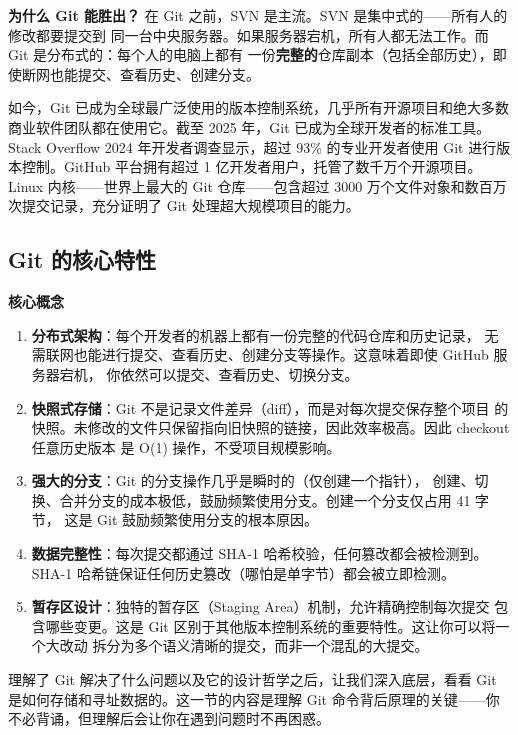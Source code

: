 \documentclass[12pt,a4paper,openany]{ctexbook}
\begin{document}
\textbf{为什么 Git 能胜出？} 在 Git 之前，SVN 是主流。SVN 是集中式的——所有人的修改都要提交到
同一台中央服务器。如果服务器宕机，所有人都无法工作。而 Git 是分布式的：每个人的电脑上都有
一份\textbf{完整的}仓库副本（包括全部历史），即使断网也能提交、查看历史、创建分支。

如今，Git 已成为全球最广泛使用的版本控制系统，几乎所有开源项目和绝大多数商业软件团队都在使用它。截至 2025 年，Git 已成为全球开发者的标准工具。Stack Overflow 2024 年开发者调查显示，超过 93\% 的专业开发者使用 Git 进行版本控制。GitHub 平台拥有超过 1 亿开发者用户，托管了数千万个开源项目。Linux 内核——世界上最大的 Git 仓库——包含超过 3000 万个文件对象和数百万次提交记录，充分证明了 Git 处理超大规模项目的能力。

\subsection{Git 的核心特性}

\medskip
\textbf{核心概念}
\begin{enumerate}[leftmargin=1.5em]
  \item \textbf{分布式架构}：每个开发者的机器上都有一份完整的代码仓库和历史记录，
        无需联网也能进行提交、查看历史、创建分支等操作。这意味着即使 GitHub 服务器宕机，
        你依然可以提交、查看历史、切换分支。
  \item \textbf{快照式存储}：Git 不是记录文件差异（diff），而是对每次提交保存整个项目
        的快照。未修改的文件只保留指向旧快照的链接，因此效率极高。因此 checkout 任意历史版本
        是 O(1) 操作，不受项目规模影响。
  \item \textbf{强大的分支}：Git 的分支操作几乎是瞬时的（仅创建一个指针），
        创建、切换、合并分支的成本极低，鼓励频繁使用分支。创建一个分支仅占用 41 字节，
        这是 Git 鼓励频繁使用分支的根本原因。
  \item \textbf{数据完整性}：每次提交都通过 SHA-1 哈希校验，任何篡改都会被检测到。SHA-1 哈希链保证任何历史篡改（哪怕是单字节）都会被立即检测。
  \item \textbf{暂存区设计}：独特的暂存区（Staging Area）机制，允许精确控制每次提交
        包含哪些变更。这是 Git 区别于其他版本控制系统的重要特性。这让你可以将一个大改动
        拆分为多个语义清晰的提交，而非一个混乱的大提交。
\end{enumerate}
\medskip

理解了 Git 解决了什么问题以及它的设计哲学之后，让我们深入底层，看看 Git 是如何存储和寻址数据的。这一节的内容是理解 Git 命令背后原理的关键——你不必背诵，但理解后会让你在遇到问题时不再困惑。
\end{document}
